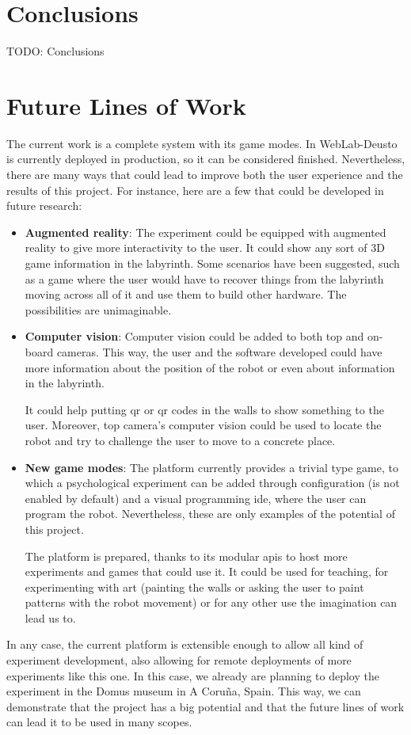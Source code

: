 \section{Conclusions}

TODO: Conclusions

\section{Future Lines of Work}

The current work is a complete system with its game modes. In WebLab-Deusto is currently deployed in
production, so it can be considered finished. Nevertheless, there are many ways that could lead to
improve both the user experience and the results of this project. For instance, here are a few that
could be developed in future research:

\begin{itemize}

\item \textbf{Augmented reality}: The experiment could be equipped with augmented reality to give
more interactivity to the user. It could show any sort of 3D game information in the labyrinth. Some
scenarios have been suggested, such as a game where the user would have to recover things from the
labyrinth moving across all of it and use them to build other hardware. The possibilities are
unimaginable.

\item \textbf{Computer vision}: Computer vision could be added to both top and on-board cameras.
This way, the user and the software developed could have more information about the position of the
robot or even about information in the labyrinth.

It could help putting \acrshort{qr} or
\acrlong{qr} codes in the walls to show something to the user. Moreover, top camera's computer
vision could be used to locate the robot and try to challenge the user to move to a concrete place.

\item \textbf{New game modes}: The platform currently provides a trivial type game, to which a
psychological experiment can be added through configuration (is not enabled by default) and a visual
programming \acrshort{ide}, where the user can program the robot. Nevertheless, these are only
examples of the potential of this project.

The platform is prepared, thanks to its modular \acrshort{api}s to host more experiments and games
that could use it. It could be used for teaching, for experimenting with art (painting the walls or
asking the user to paint patterns with the robot movement) or for any other use the imagination can
lead us to.

\end{itemize}

In any case, the current platform is extensible enough to allow all kind of experiment development,
also allowing for remote deployments of more experiments like this one. In this case, we already
are planning to deploy the experiment in the Domus museum in A Coruña, Spain. This way, we can
demonstrate that the project has a big potential and that the future lines of work can lead it to
be used in many scopes.
